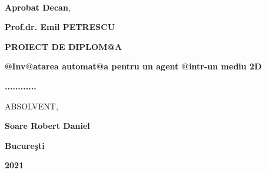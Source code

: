 \documentclass[11pt,twoside]{book}
\begin{document}
~~~

\begin{flushright}
{\bf Aprobat Decan},

\vspace{0.2cm}

{\bf Prof.dr. Emil PETRESCU}
\end{flushright}

\vspace{2cm}

\centerline{\huge \bf PROIECT DE DIPLOM@A}

\vspace{1.5cm}

\centerline{\Large \bf @Inv@atarea automat@a pentru un agent @intr-un mediu 2D} \vspace{0.35cm}

\centerline{\Large \bf ............}

\vspace{3cm}

 \hfill {ABSOLVENT,}

 \hfill{\bf Soare Robert Daniel}

\vspace{3cm}

\centerline{\bf Bucure\c sti}

\vspace{0.5cm}

\centerline{\bf 2021}

\newpage

\setcounter{page}{3}
\tableofcontents
{}


\printindex  {} \thispagestyle{empty}

\end{document}
